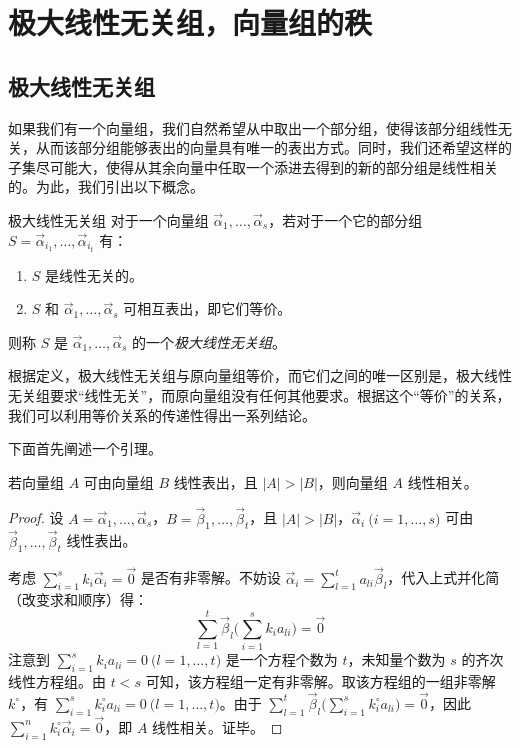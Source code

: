 
\section{极大线性无关组，向量组的秩}

\subsection{极大线性无关组}

如果我们有一个向量组，我们自然希望从中取出一个部分组，使得该部分组线性无关，从而该部分组能够表出的向量具有唯一的表出方式。同时，我们还希望这样的子集尽可能大，使得从其余向量中任取一个添进去得到的新的部分组是线性相关的。为此，我们引出以下概念。

\begin{definition}{极大线性无关组}
	对于一个向量组 $\vec \alpha_1, \ldots, \vec \alpha_s$，若对于一个它的部分组 $S = \vec \alpha_{i_1}, \ldots, \vec \alpha_{i_t}$ 有：

	\begin{enumerate}
		\item $S$ 是线性无关的。
		\item $S$ 和 $\vec \alpha_1, \ldots, \vec \alpha_s$ 可相互表出，即它们等价。
	\end{enumerate}

	则称 $S$ 是 $\vec \alpha_1, \ldots, \vec \alpha_s$ 的一个\emph{极大线性无关组}。
\end{definition}

根据定义，极大线性无关组与原向量组等价，而它们之间的唯一区别是，极大线性无关组要求“线性无关”，而原向量组没有任何其他要求。根据这个“等价”的关系，我们可以利用等价关系的传递性得出一系列结论。

下面首先阐述一个引理。

\begin{theorem}
	若向量组 $A$ 可由向量组 $B$ 线性表出，且 $|A| > |B|$，则向量组 $A$ 线性相关。
\end{theorem}

\begin{proof}
	设 $A = \vec \alpha_1, \ldots, \vec \alpha_s$，$B = \vec \beta_1, \ldots, \vec \beta_t$，且 $|A| > |B|$，$\vec \alpha_i \pod{i = 1, \ldots, s}$ 可由 $\vec \beta_1, \ldots, \vec \beta_t$ 线性表出。

	考虑 $\sum\limits_{i = 1}^s k_i \vec \alpha_i = \vec 0$ 是否有非零解。不妨设 $\vec \alpha_i = \sum\limits_{l = 1}^t a_{li} \vec \beta_l$，代入上式并化简（改变求和顺序）得：
	$$
	\sum_{l = 1}^t \vec \beta_l \biggl( \sum_{i = 1}^s k_i a_{li} \biggr) = \vec 0
	$$
	注意到 $\sum\limits_{i = 1}^s k_i a_{li} = 0 \pod{l = 1, \ldots, t}$ 是一个方程个数为 $t$，未知量个数为 $s$ 的齐次线性方程组。由 $t < s$ 可知，该方程组一定有非零解。取该方程组的一组非零解 $k^\circ$，有 $\sum\limits_{i = 1}^s k^\circ_i a_{li} = 0 \pod{l = 1, \ldots, t}$。由于 $\sum\limits_{l = 1}^t \vec \beta_l \biggl( \sum\limits_{i = 1}^s k^\circ_i a_{li} \biggr) = \vec 0$，因此 $\sum\limits_{i = 1}^n k^\circ_i \vec \alpha_i = \vec 0$，即 $A$ 线性相关。证毕。
\end{proof}

